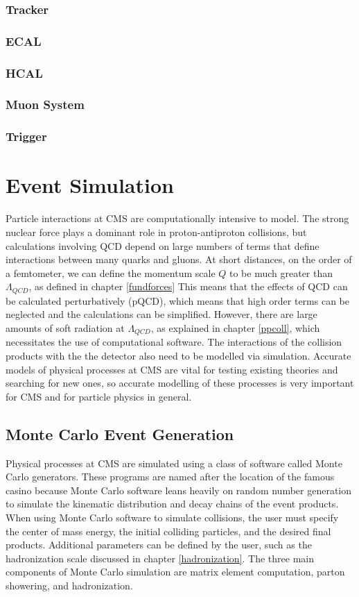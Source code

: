 \documentclass[oneside, letterpaper, oldfontcommands]{memoir}
\begin{document}
\subsection{Tracker}\label{tracker}
\subsection{ECAL}\label{ecal}
\subsection{HCAL}\label{hcal}
\subsection{Muon System}\label{muonsys}
\subsection{Trigger}\label{trigger}

\chapter{Event Simulation}\label{eventsim}
\qquad Particle interactions at CMS are computationally intensive to model. The strong nuclear force plays a dominant role in proton-antiproton collisions, but calculations involving QCD depend on large numbers of terms that define interactions between many quarks and gluons. At short distances, on the order of a femtometer, we can define the momentum scale $Q$ to be much greater than $\Lambda_{QCD}$, as defined in chapter \ref{fundforces}  This means that the effects of QCD can be calculated perturbatively (pQCD), which means that high order terms can be neglected and the calculations can be simplified. However, there are large amounts of soft radiation at $\Lambda_{QCD}$, as explained in chapter \ref{ppcoll}, which necessitates the use of computational software.
\qquad The interactions of the collision products with the the detector also need to be modelled via simulation. Accurate models of physical processes at CMS are vital for testing existing theories and searching for new ones, so accurate modelling of these processes is very important for CMS and for particle physics in general.
   
\section{Monte Carlo Event Generation}\label{mcgen}
\qquad Physical processes at CMS are simulated using a class of software called Monte Carlo generators. These programs are named after the location of the famous casino because Monte Carlo software leans heavily on random number generation to simulate the kinematic distribution and decay chains of the event products. When using Monte Carlo software to simulate collisions, the user must specify the center of mass energy, the initial colliding particles, and the desired final products. Additional parameters can be defined by the user, such as the hadronization scale discussed in chapter \ref{hadronization}.  The three main components of Monte Carlo simulation are matrix element computation, parton showering, and hadronization. 
\end{document}
